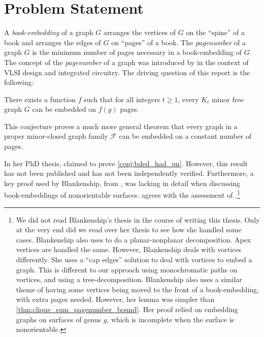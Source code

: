 \section{Problem Statement}

A \textit{book-embedding} of a graph $G$ arranges the vertices of $G$ on the ``spine'' of a book and arranges the edges of $G$ on ``pages'' of a book. The \textit{pagenumber} of a graph \(G\) is the minimum number of pages necessary in a book-embedding of \(G\). The concept of the \textit{pagenumber} of a graph was introduced by \textcite{ollmannBookThicknessVarious1973} in the context of VLSI design and integrated circuitry. 
The driving question of this report is the following:
\begin{conjecture}\label{conj:bded_had_pn}
	There exists a function $f$ such that for all integers $t \geq 1$, every $K_t$ minor free graph $G$ can be embedded on $f(g)$ pages.
\end{conjecture}

This conjecture proves a much more general theorem that every graph in a proper minor-closed graph family $\mathcal{F}$ can be embedded on a constant number of pages. 

In her PhD thesis, \textcite{Blankenship-PhD03} claimed to prove \cref{conj:bded_had_pn}. However, this result has not been published and has not been independently verified. Furthermore, a key proof used by Blankenship, from \textcite{heathPagenumberGenusGraphs1992}, was lacking in detail when discussing book-embeddings of nonorientable surfaces. \textcite{nakamotoBookEmbeddingProjectiveplanar2015} agrees with ths assessment of \textcite{heathPagenumberGenusGraphs1992}.\footnote{
	We did not read Blankenship's thesis in the course of writing this thesis. Only at the very end did we read over her thesis to see how she handled some cases. 
	Blankenship also uses \textcite{heathPagenumberGenusGraphs1992} to do a planar-nonplanar decomposition. Apex vertices are handled the same. However, Blankenship deals with vortices differently. She uses a ``cap edges'' solution to deal with vortices to embed a graph. This is different to our approach using monochromatic paths on vortices, and using a tree-decomposition. 
	Blankenship also uses a similar theme of having some vertices being moved to the front of a book-embedding, with extra pages needed. However, her lemma was simpler than \cref{thm:clique_sum_pagenumber_bound}. Her proof relied on \textcite{heathPagenumberGenusGraphs1992} embedding graphs on surfaces of genus $g$, which is incomplete when the surface is nonorientable. 

}


